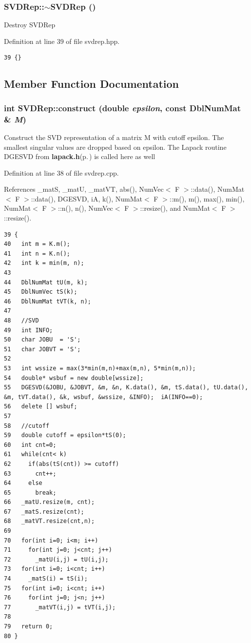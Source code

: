 \subsubsection{\setlength{\rightskip}{0pt plus 5cm}SVDRep::$\sim$SVDRep ()\hspace{0.3cm}{\tt  [inline]}}\label{classSVDRep_a0b57c7efa82d38ea8493b19cf28858d_a0b57c7efa82d38ea8493b19cf28858d}


Destroy SVDRep 

Definition at line 39 of file svdrep.hpp.

\footnotesize\begin{verbatim}39 {}
\end{verbatim}\normalsize 




\subsection{Member Function Documentation}
\subsubsection{\setlength{\rightskip}{0pt plus 5cm}int SVDRep::construct (double {\em epsilon}, const {\bf Dbl\-Num\-Mat} \& {\em M})}\label{classSVDRep_aca629570ae9a26a6cbeeb3f68fd0860_aca629570ae9a26a6cbeeb3f68fd0860}


Construct the SVD representation of a matrix M with cutoff epsilon. The smallest singular values are dropped based on epsilon. The Lapack routine DGESVD from {\bf lapack.h}{\rm (p.\,\pageref{lapack_8h})} is called here as well 

Definition at line 38 of file svdrep.cpp.

References \_\-mat\-S, \_\-mat\-U, \_\-mat\-VT, abs(), Num\-Vec$<$ F $>$::data(), Num\-Mat$<$ F $>$::data(), DGESVD, i\-A, k(), Num\-Mat$<$ F $>$::m(), m(), max(), min(), Num\-Mat$<$ F $>$::n(), n(), Num\-Vec$<$ F $>$::resize(), and Num\-Mat$<$ F $>$::resize().

\footnotesize\begin{verbatim}39 {
40   int m = K.m();
41   int n = K.n();
42   int k = min(m, n);
43   
44   DblNumMat tU(m, k);
45   DblNumVec tS(k);
46   DblNumMat tVT(k, n);
47   
48   //SVD
49   int INFO;
50   char JOBU  = 'S';
51   char JOBVT = 'S';
52   
53   int wssize = max(3*min(m,n)+max(m,n), 5*min(m,n));
54   double* wsbuf = new double[wssize];
55   DGESVD(&JOBU, &JOBVT, &m, &n, K.data(), &m, tS.data(), tU.data(), &m, tVT.data(), &k, wsbuf, &wssize, &INFO);  iA(INFO==0);
56   delete [] wsbuf;
57   
58   //cutoff
59   double cutoff = epsilon*tS(0);
60   int cnt=0;
61   while(cnt< k)
62     if(abs(tS(cnt)) >= cutoff)
63       cnt++;
64     else
65       break;
66   _matU.resize(m, cnt);
67   _matS.resize(cnt);    
68   _matVT.resize(cnt,n);
69   
70   for(int i=0; i<m; i++)
71     for(int j=0; j<cnt; j++)
72       _matU(i,j) = tU(i,j);
73   for(int i=0; i<cnt; i++)
74     _matS(i) = tS(i);
75   for(int i=0; i<cnt; i++)
76     for(int j=0; j<n; j++)
77       _matVT(i,j) = tVT(i,j);
78   
79   return 0;
80 }
\end{verbatim}\normalsize 


